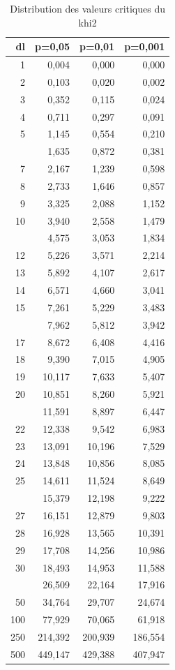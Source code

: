 \documentclass[
  11pt,
  french,
]{book}
\begin{document}
\begin{table}

\caption{\label{tab:tableCritiqueChi2}Distribution des valeurs critiques du khi2}
\centering
\fontsize{8}{10}\selectfont
\begin{tabular}[t]{rrrr}
\toprule
dl & p=0,05 & p=0,01 & p=0,001\\
\midrule
1 & 0,004 & 0,000 & 0,000\\
2 & 0,103 & 0,020 & 0,002\\
3 & 0,352 & 0,115 & 0,024\\
4 & 0,711 & 0,297 & 0,091\\
5 & 1,145 & 0,554 & 0,210\\
\addlinespace
6 & 1,635 & 0,872 & 0,381\\
7 & 2,167 & 1,239 & 0,598\\
8 & 2,733 & 1,646 & 0,857\\
9 & 3,325 & 2,088 & 1,152\\
10 & 3,940 & 2,558 & 1,479\\
\addlinespace
11 & 4,575 & 3,053 & 1,834\\
12 & 5,226 & 3,571 & 2,214\\
13 & 5,892 & 4,107 & 2,617\\
14 & 6,571 & 4,660 & 3,041\\
15 & 7,261 & 5,229 & 3,483\\
\addlinespace
16 & 7,962 & 5,812 & 3,942\\
17 & 8,672 & 6,408 & 4,416\\
18 & 9,390 & 7,015 & 4,905\\
19 & 10,117 & 7,633 & 5,407\\
20 & 10,851 & 8,260 & 5,921\\
\addlinespace
21 & 11,591 & 8,897 & 6,447\\
22 & 12,338 & 9,542 & 6,983\\
23 & 13,091 & 10,196 & 7,529\\
24 & 13,848 & 10,856 & 8,085\\
25 & 14,611 & 11,524 & 8,649\\
\addlinespace
26 & 15,379 & 12,198 & 9,222\\
27 & 16,151 & 12,879 & 9,803\\
28 & 16,928 & 13,565 & 10,391\\
29 & 17,708 & 14,256 & 10,986\\
30 & 18,493 & 14,953 & 11,588\\
\addlinespace
40 & 26,509 & 22,164 & 17,916\\
50 & 34,764 & 29,707 & 24,674\\
100 & 77,929 & 70,065 & 61,918\\
250 & 214,392 & 200,939 & 186,554\\
500 & 449,147 & 429,388 & 407,947\\
\bottomrule
\end{tabular}
\end{table}
\end{document}
